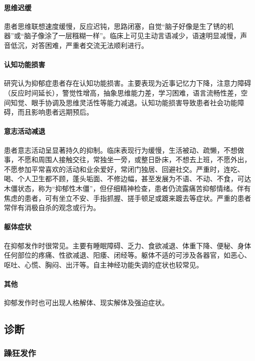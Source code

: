\paragraph{思维迟缓}

患者思维联想速度缓慢，反应迟钝，思路闭塞，自觉“脑子好像是生了锈的机器”或“脑子像涂了一层糨糊一样”。临床上可见主动言语减少，语速明显减慢，声音低沉，对答困难，严重者交流无法顺利进行。
\paragraph{认知功能损害}

研究认为抑郁症患者存在认知功能损害。主要表现为近事记忆力下降，注意力障碍（反应时间延长），警觉性增高，抽象思维能力差，学习困难，语言流畅性差，空间知觉、眼手协调及思维灵活性等能力减退。认知功能损害导致患者社会功能障碍，而且影响患者远期预后。
\paragraph{意志活动减退}

患者意志活动呈显著持久的抑制。临床表现行为缓慢，生活被动、疏懒，不想做事，不愿和周围人接触交往，常独坐一旁，或整日卧床，不想去上班，不愿外出，不愿参加平常喜欢的活动和业余爱好，常闭门独居、回避社交。严重时，连吃、喝、个人卫生都不顾，蓬头垢面、不修边幅，甚至发展为不语、不动、不食，可达木僵状态，称为“抑郁性木僵”，但仔细精神检查，患者仍流露痛苦抑郁情绪。伴有焦虑的患者，可有坐立不安、手指抓握、搓手顿足或踱来踱去等症状。严重的患者常伴有消极自杀的观念或行为。
\paragraph{躯体症状}

在抑郁发作时很常见。主要有睡眠障碍、乏力、食欲减退、体重下降、便秘、身体任何部位的疼痛、性欲减退、阳痿、闭经等。躯体不适的可涉及各器官，如恶心、呕吐、心慌、胸闷、出汗等。自主神经功能失调的症状也较常见。
\paragraph{其他}

抑郁发作时也可出现人格解体、现实解体及强迫症状。

\subsection{诊断}

\subsubsection{躁狂发作}

